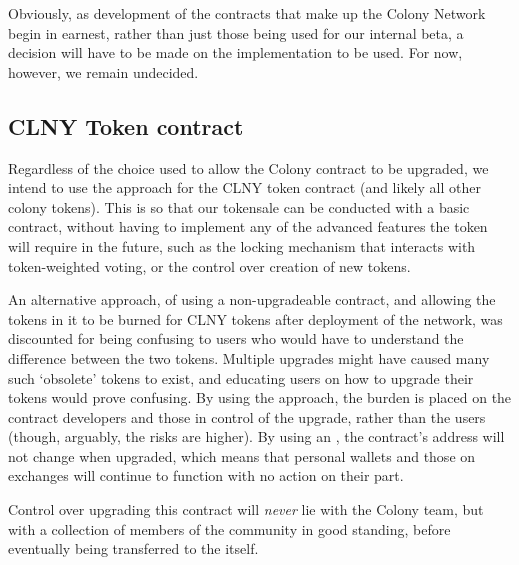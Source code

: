 Obviously, as development of the contracts that make up the Colony Network begin in earnest, rather than just those being used for our internal beta, a decision will have to be made on the implementation to be used. For now, however, we remain undecided.

\subsection{CLNY Token contract}\label{app:clnyupgrade}
Regardless of the choice used to allow the Colony contract to be upgraded, we intend to use the  approach for the CLNY token contract (and likely all other colony tokens). This is so that our tokensale can be conducted with a basic contract, without having to implement any of the advanced features the token will require in the future, such as the locking mechanism that interacts with token-weighted voting, or the control over creation of new tokens.

An alternative approach, of using a non-upgradeable contract, and allowing the tokens in it to be burned for CLNY tokens after deployment of the network, was discounted for being confusing to users who would have to understand the difference between the two tokens. Multiple upgrades might have caused many such `obsolete' tokens to exist, and educating users on how to upgrade their tokens would prove confusing. By using the  approach, the burden is placed on the contract developers and those in control of the upgrade, rather than the users (though, arguably, the risks are higher). By using an , the contract's address will not change when upgraded, which means that personal wallets and those on exchanges will continue to function with no action on their part.

Control over upgrading this contract will \emph{never} lie with the Colony team, but with a collection of members of the community in good standing, before eventually being transferred to the \rc itself. 